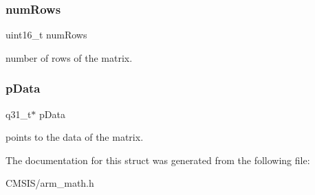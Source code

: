 \subsubsection{\texorpdfstring{numRows}{numRows}}
{\footnotesize\ttfamily uint16\+\_\+t num\+Rows}

number of rows of the matrix. \mbox{\label{structarm__matrix__instance__q31_ad296f76577326ff280726323536eed6d}} 
\subsubsection{\texorpdfstring{pData}{pData}}
{\footnotesize\ttfamily q31\+\_\+t$\ast$ p\+Data}

points to the data of the matrix. 

The documentation for this struct was generated from the following file\+:\begin{DoxyCompactItemize}
\item 
C\+M\+S\+I\+S/arm\+\_\+math.\+h\end{DoxyCompactItemize}
